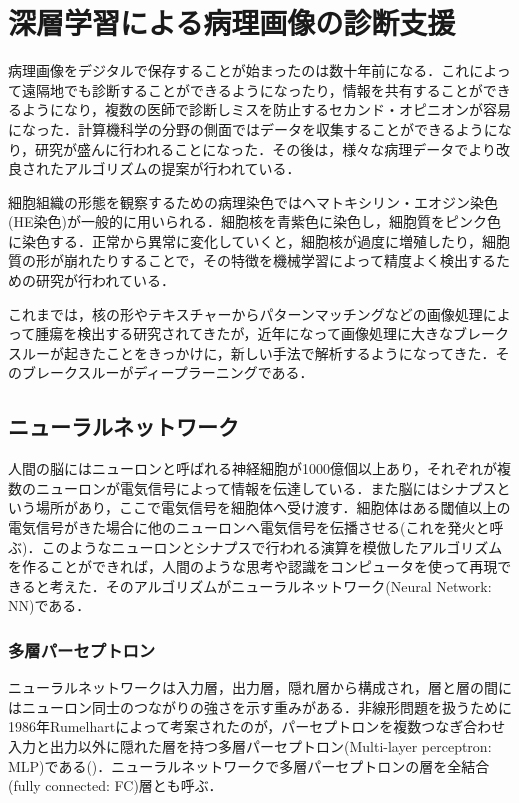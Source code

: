 \chapter{深層学習による病理画像の診断支援}
\label{chap_review}

病理画像をデジタルで保存することが始まったのは数十年前になる．これによって遠隔地でも診断することができるようになったり，情報を共有することができるようになり，複数の医師で診断しミスを防止するセカンド・オピニオンが容易になった．計算機科学の分野の側面ではデータを収集することができるようになり，研究が盛んに行われることになった．その後は，様々な病理データでより改良されたアルゴリズムの提案が行われている．

細胞組織の形態を観察するための病理染色ではヘマトキシリン・エオジン染色(HE染色)が一般的に用いられる．細胞核を青紫色に染色し，細胞質をピンク色に染色する．正常から異常に変化していくと，細胞核が過度に増殖したり，細胞質の形が崩れたりすることで，その特徴を機械学習によって精度よく検出するための研究が行われている．

これまでは，核の形やテキスチャーからパターンマッチングなどの画像処理によって腫瘍を検出する研究されてきたが，近年になって画像処理に大きなブレークスルーが起きたことをきっかけに，新しい手法で解析するようになってきた．そのブレークスルーがディープラーニングである．

\section{ニューラルネットワーク}\label{sec:NeuralNetwork}
人間の脳にはニューロンと呼ばれる神経細胞が1000億個以上あり，それぞれが複数のニューロンが電気信号によって情報を伝達している．また脳にはシナプスという場所があり，ここで電気信号を細胞体へ受け渡す．細胞体はある閾値以上の電気信号がきた場合に他のニューロンへ電気信号を伝播させる(これを発火と呼ぶ)．このようなニューロンとシナプスで行われる演算を模倣したアルゴリズムを作ることができれば，人間のような思考や認識をコンピュータを使って再現できると考えた．そのアルゴリズムがニューラルネットワーク(Neural Network: NN)である．

\subsection{多層パーセプトロン}
ニューラルネットワークは入力層，出力層，隠れ層から構成され，層と層の間にはニューロン同士のつながりの強さを示す重みがある．非線形問題を扱うために1986年Rumelhartによって考案されたのが，パーセプトロンを複数つなぎ合わせ入力と出力以外に隠れた層を持つ多層パーセプトロン(Multi-layer perceptron: MLP)である()．ニューラルネットワークで多層パーセプトロンの層を全結合(fully connected: FC)層とも呼ぶ．

